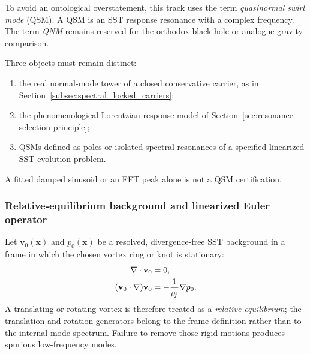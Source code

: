         To avoid an ontological overstatement, this track uses the term
        \emph{quasinormal swirl mode} (QSM).  A QSM is an SST response resonance with a
        complex frequency.  The term \emph{QNM} remains reserved for the orthodox
        black-hole or analogue-gravity comparison.

        Three objects must remain distinct:
        \begin{enumerate}
            \item the real normal-mode tower of a closed conservative carrier, as in
            Section~\ref{subsec:spectral_locked_carriers};
            \item the phenomenological Lorentzian response model of
            Section~\ref{sec:resonance-selection-principle};
            \item QSMs defined as poles or isolated spectral resonances of a specified
            linearized SST evolution problem.
        \end{enumerate}
        A fitted damped sinusoid or an FFT peak alone is not a QSM certification.

    \subsubsection*{Relative-equilibrium background and linearized Euler operator}

        Let \(\mathbf v_0(\mathbf x)\) and \(p_0(\mathbf x)\) be a resolved,
        divergence-free SST background in a frame in which the chosen vortex ring or
        knot is stationary:
        \begin{align}
            \nabla\cdot\mathbf v_0 &= 0,
            \\
            (\mathbf v_0\cdot\nabla)\mathbf v_0
            &=
            -\frac{1}{\rho_{\!f}}\nabla p_0.
            \label{eq:rt_qss_background_euler}
        \end{align}
        A translating or rotating vortex is therefore treated as a
        \emph{relative equilibrium}; the translation and rotation generators belong to
        the frame definition rather than to the internal mode spectrum.  Failure to
        remove those rigid motions produces spurious low-frequency modes.

